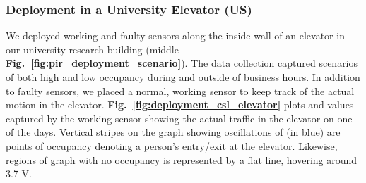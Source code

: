 





\subsubsection{Deployment in a University Elevator (US)}\label{subsubsec:elevator} 
%
We deployed working and faulty sensors along the inside wall of an elevator in our university research building (middle {\bfseries Fig.~\ref{fig:pir_deployment_scenario}}). 
%
The data collection captured scenarios of both high and low occupancy during and outside of business hours. %
%
In addition to faulty sensors, we placed a normal, working sensor to keep track of the actual motion in the elevator. 
%
{\bfseries Fig.~\ref{fig:deployment_csl_elevator}} plots \cout and \aout values captured by the working sensor showing the actual traffic in the elevator on one of the days.%
Vertical stripes on the graph showing oscillations of \cout (in blue) are points of occupancy \ie denoting a person's entry/exit at the elevator. Likewise, regions of graph with no occupancy is represented by a flat line, hovering around 3.7 V. 

